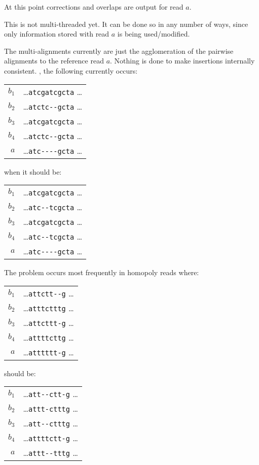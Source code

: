 \documentclass[letterpaper,11pt]{article}
\newenvironment{technotes}{\bq\small\bf\bi\exdent{Technical Notes:}}{\ei\eq}
\def\btn{\begin{technotes}}
\begin{document}
  At this point corrections and overlaps are output for read $a$.
  \btn
  \item
    This is not multi-threaded yet.  It can be done so in any number of ways,
    since only information stored with read $a$ is being used/modified.
  \item
    The multi-alignments currently are just the agglomeration of the
    pairwise alignments to the reference read $a$.  Nothing is done to
    make insertions internally consistent.  \Eg, the following currently
    occurs:
    \bq
      \begin{tabular}{rl}
        $b_1$ & \ldots \verb`atcgatcgcta` \ldots \\
        $b_2$ & \ldots \verb`atctc--gcta` \ldots \\
        $b_3$ & \ldots \verb`atcgatcgcta` \ldots \\
        $b_4$ & \ldots \verb`atctc--gcta` \ldots \\
          $a$ & \ldots \verb`atc----gcta` \ldots
      \end{tabular}
    \eq
    when it should be:
    \bq
      \begin{tabular}{rl}
        $b_1$ & \ldots \verb`atcgatcgcta` \ldots \\
        $b_2$ & \ldots \verb`atc--tcgcta` \ldots \\
        $b_3$ & \ldots \verb`atcgatcgcta` \ldots \\
        $b_4$ & \ldots \verb`atc--tcgcta` \ldots \\
          $a$ & \ldots \verb`atc----gcta` \ldots
      \end{tabular}
    \eq
    The problem occurs most frequently in homopoly reads where:
    \bq
      \begin{tabular}{rl}
        $b_1$ & \ldots \verb`attctt--g` \ldots \\
        $b_2$ & \ldots \verb`atttctttg` \ldots \\
        $b_3$ & \ldots \verb`attcttt-g` \ldots \\
        $b_4$ & \ldots \verb`attttcttg` \ldots \\
          $a$ & \ldots \verb`atttttt-g` \ldots
      \end{tabular}
    \eq
    should be:
    \bq
      \begin{tabular}{rl}
        $b_1$ & \ldots \verb`att--ctt-g` \ldots \\
        $b_2$ & \ldots \verb`attt-ctttg` \ldots \\
        $b_3$ & \ldots \verb`att--ctttg` \ldots \\
        $b_4$ & \ldots \verb`attttctt-g` \ldots \\
          $a$ & \ldots \verb`attt--tttg` \ldots
      \end{tabular}
\end{document}
